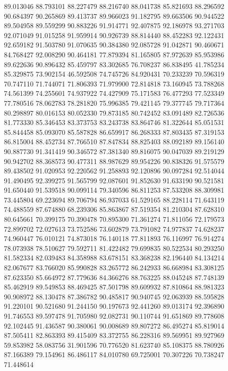 89.013046
88.793101
88.227479
88.216740
88.041738
85.821693
88.296592
90.684397
90.265869
89.413737
89.966023
91.182795
89.663506
90.944522
89.504958
89.559299
90.883226
91.914771
92.407875
92.186978
93.271703
92.071049
91.015258
91.959914
90.926739
88.814440
88.452283
92.122431
92.659182
91.503780
91.070635
90.384380
92.085728
91.042871
90.460671
84.768427
92.008290
90.464181
77.879394
81.165805
87.972639
85.953986
89.622636
90.896432
85.459797
83.302685
76.708237
86.838495
41.785234
85.329875
73.902154
46.592508
74.745726
84.920431
70.233239
70.596319
70.747110
71.744071
71.806393
71.979900
72.814818
73.160945
73.788268
74.561399
74.255601
74.937922
74.427909
75.171583
76.477293
77.523349
77.780516
78.062783
78.281820
75.996385
79.421145
79.377745
79.717364
80.298897
80.016153
80.052330
79.873185
80.742452
83.091489
82.726536
81.773330
85.346453
83.373753
83.243738
83.864746
81.322644
85.051531
85.844458
85.093070
85.587828
86.659917
86.268333
87.803435
87.319153
86.815004
88.452734
87.766510
87.847834
88.825403
88.092189
89.156140
90.887730
91.341419
90.346572
87.381340
89.816075
90.047039
89.219129
90.942702
88.368573
90.477311
88.987629
89.954226
90.838326
91.575579
89.438502
91.020953
92.220562
91.258893
92.120896
90.097284
92.514044
91.490495
92.399275
91.565799
92.087601
91.852630
91.633190
90.521581
91.650440
91.539518
90.099114
79.340596
86.811253
87.533208
88.309981
73.445804
69.223694
89.706794
86.937033
61.529165
88.228114
71.643119
74.488559
87.674880
68.239306
85.863867
87.519354
81.210304
87.628310
80.645661
70.399175
70.390478
70.895300
71.361274
71.811056
72.179573
72.899702
72.027613
73.752586
73.602879
73.791082
74.977837
74.628237
74.960447
76.010121
74.873018
76.140118
77.811893
76.116997
76.914274
78.073938
78.510627
79.592711
81.422482
79.699835
80.522534
80.293250
81.582334
82.039483
84.358988
83.678151
83.368238
82.196440
84.134214
82.067677
83.766020
85.990828
83.265772
86.242933
86.668984
83.308125
87.623350
85.664972
87.779636
84.366276
88.763225
88.045248
87.748139
85.462919
89.549853
88.469425
87.501798
89.609932
87.810864
88.981323
90.908972
88.130478
87.386782
90.485817
90.940745
92.063939
88.595828
91.220101
90.521680
91.244150
90.197673
92.441260
89.013174
92.396890
91.746553
89.597478
91.705980
92.082731
90.110744
91.651869
89.778608
92.102445
91.436587
90.380061
90.008689
89.807272
86.495274
85.819014
87.505411
82.863393
89.415409
83.372755
86.228316
89.569951
89.927969
59.853982
58.083756
31.901596
70.776520
81.623740
85.108375
88.780926
87.166389
79.154961
86.486117
84.010780
69.725001
70.307226
70.738247
71.448614
